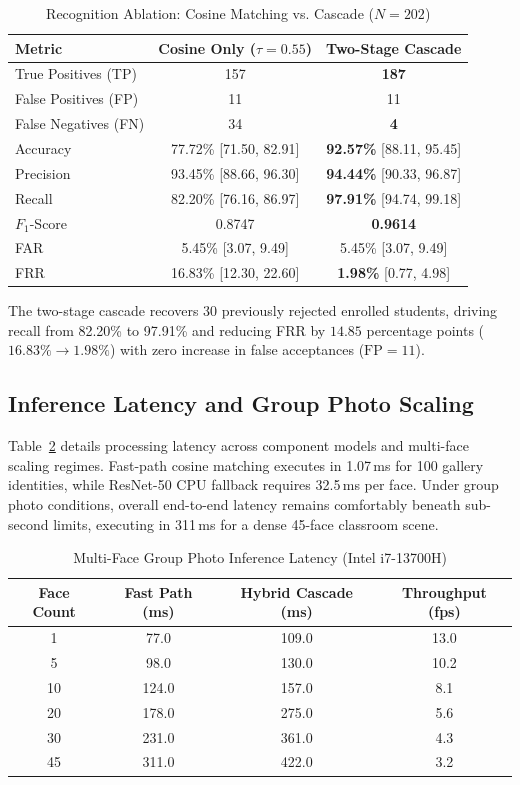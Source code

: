 \documentclass[conference]{IEEEtran}
\begin{document}
\begin{table}[t]
\caption{Recognition Ablation: Cosine Matching vs. Cascade ($N=202$)}
\label{tab:ablation}
\centering
\small
\begin{tabular}{lcc}
\toprule
Metric & Cosine Only ($\tau=0.55$) & Two-Stage Cascade \\
\midrule
True Positives (TP) & 157 & \textbf{187} \\
False Positives (FP) & 11 & 11 \\
False Negatives (FN) & 34 & \textbf{4} \\
\midrule
Accuracy & 77.72\% [71.50, 82.91] & \textbf{92.57\%} [88.11, 95.45] \\
Precision & 93.45\% [88.66, 96.30] & \textbf{94.44\%} [90.33, 96.87] \\
Recall & 82.20\% [76.16, 86.97] & \textbf{97.91\%} [94.74, 99.18] \\
$F_1$-Score & 0.8747 & \textbf{0.9614} \\
FAR & 5.45\% [3.07, 9.49] & 5.45\% [3.07, 9.49] \\
FRR & 16.83\% [12.30, 22.60] & \textbf{1.98\%} [0.77, 4.98] \\
\bottomrule
\end{tabular}
\end{table}

The two-stage cascade recovers 30 previously rejected enrolled students, driving recall from 82.20\% to 97.91\% and reducing FRR by $14.85$ percentage points ($16.83\% \to 1.98\%$) with zero increase in false acceptances ($\text{FP}=11$).

\subsection{Inference Latency and Group Photo Scaling}
Table~\ref{tab:latency} details processing latency across component models and multi-face scaling regimes. Fast-path cosine matching executes in 1.07\,ms for 100 gallery identities, while ResNet-50 CPU fallback requires 32.5\,ms per face. Under group photo conditions, overall end-to-end latency remains comfortably beneath sub-second limits, executing in 311\,ms for a dense 45-face classroom scene.

\begin{table}[t]
\caption{Multi-Face Group Photo Inference Latency (Intel i7-13700H)}
\label{tab:latency}
\centering
\small
\begin{tabular}{cccc}
\toprule
Face Count & Fast Path (ms) & Hybrid Cascade (ms) & Throughput (fps) \\
\midrule
1 & 77.0 & 109.0 & 13.0 \\
5 & 98.0 & 130.0 & 10.2 \\
10 & 124.0 & 157.0 & 8.1 \\
20 & 178.0 & 275.0 & 5.6 \\
30 & 231.0 & 361.0 & 4.3 \\
45 & 311.0 & 422.0 & 3.2 \\
\bottomrule
\end{tabular}
\end{table}
\end{document}

